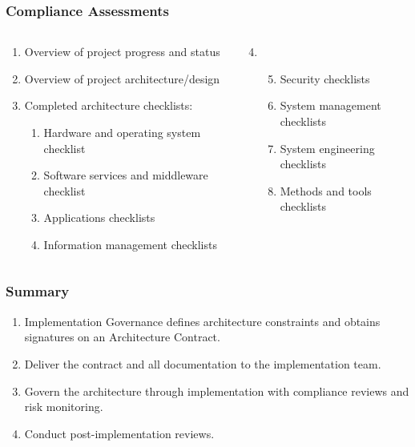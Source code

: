 \documentclass[aspectratio=169, table]{beamer}
\begin{document}
	
	\begin{frame}
		\frametitle{Compliance Assessments}
		\vspace{22pt}
		\begin{columns}[onlytextwidth]
			\begin{column}{0.5\textwidth}
				\begin{enumerate}
					\item Overview of project progress and status
					\item Overview of project architecture/design
					\item Completed architecture checklists:
					\begin{enumerate}
						\item Hardware and operating system checklist
						\item Software services and middleware checklist
						\item Applications checklists
						\item Information management checklists
						
					\end{enumerate}
				\end{enumerate}
				
			\end{column}
			\begin{column}{0.5\textwidth}
				\begin{enumerate}
					\setcounter{enumi}{3}
					\item []
					\begin{enumerate}
						\setcounter{enumii}{4}
						\item Security checklists
						\item System management checklists
						\item System engineering checklists
						\item Methods and tools checklists
					\end{enumerate}
				\end{enumerate}
			\end{column}
		\end{columns}
	\end{frame}

	\begin{frame}
		\frametitle{Summary}
		\begin{enumerate}
			\item Implementation Governance defines architecture constraints and obtains signatures on an Architecture Contract.
			\item Deliver the contract and all documentation to the implementation team.
			\item Govern the architecture through implementation with compliance reviews and risk monitoring.
			\item Conduct post-implementation reviews.
		\end{enumerate}
		
	\end{frame}
	
\end{document}
